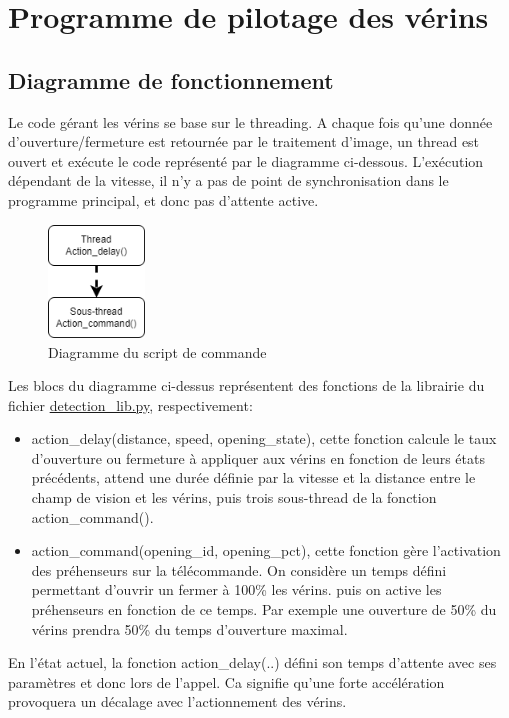 \section{Programme de pilotage des vérins}
\subsection{Diagramme de fonctionnement}
Le code gérant les vérins se base sur le threading. A chaque fois qu'une donnée d'ouverture/fermeture est retournée par le traitement d'image,
un thread est ouvert et exécute le code représenté par le diagramme ci-dessous. L'exécution dépendant de la vitesse, il n'y a pas de point de synchronisation
dans le programme principal, et donc pas d'attente active.

\begin{figure}[H]
    \centering
    \includegraphics[height=3cm]{assets/figures/diag_command.png}
    \caption{Diagramme du script de commande}
\end{figure}

Les blocs du diagramme ci-dessus représentent des fonctions de la librairie du fichier \underline{detection\_lib.py}, respectivement:
\begin{itemize}
    \item action\_delay(distance, speed, opening\_state), cette fonction calcule le taux d'ouverture ou fermeture à appliquer aux vérins en fonction de leurs états précédents,
          attend une durée définie par la vitesse et la distance entre le champ de vision et les vérins, puis trois sous-thread de la fonction action\_command().
    \item action\_command(opening\_id, opening\_pct), cette fonction gère l'activation des préhenseurs sur la télécommande. On considère un temps défini permettant d'ouvrir un fermer à 100\% les vérins.
          puis on active les préhenseurs en fonction de ce temps. Par exemple une ouverture de 50\% du vérins prendra 50\% du temps d'ouverture maximal.
\end{itemize}
En l'état actuel, la fonction action\_delay(..) défini son temps d'attente avec ses paramètres et donc lors de l'appel. Ca signifie qu'une forte accélération provoquera un décalage avec l'actionnement des vérins.

